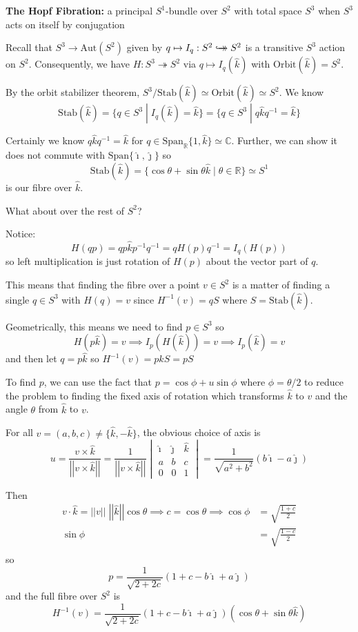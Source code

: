 \documentclass[12pt]{article}
\renewcommand{\hat}[1]{\widehat{#1}}
\newcommand{\R}{\mathbb{R}}
\newcommand{\C}{\mathbb{C}}
\newcommand{\norm}[1]{\left\vert \left\vert #1 \right\vert \right\vert}
\newcommand{\biject}{\hookrightarrow \hspace{-8pt} \rightarrow}
\newcommand{\Aut}{\text{Aut}}
\newcommand{\ihat}{\hat{\imath}}
\newcommand{\jhat}{\hat{\jmath}}
\newcommand{\khat}{\hat{k}}
\begin{document}
\textbf{The Hopf Fibration:} a principal $S^1$-bundle over $S^2$ with total space $S^3$ when $S^3$ acts on itself by conjugation

Recall that $S^3 \to \Aut(S^2)$ given by $q \mapsto I_q: S^2 \biject S^2$ is a transitive $S^3$ action on $S^2$. Consequently, we have $H: S^3 \twoheadrightarrow S^2$ via $q \mapsto I_q(\khat)$ with $\text{Orbit}(\khat) = S^2$. 

By the orbit stabilizer theorem, $S^3/\text{Stab}(\khat) \simeq \text{Orbit}(\khat) \simeq S^2$. We know 
\[\text{Stab}(\khat) = \{q \in S^3 \; | \; I_q(\khat) = \khat\} = \{q \in S^3 \; | \; q\khat q^{-1} = \khat\}\] 

Certainly we know $q\khat q^{-1} = \khat$ for $q \in \text{Span}_{\R}\{1, \khat\} \simeq \C$. Further, we can show it does not commute with $\text{Span}\{\ihat, \jhat\}$ so 
\[\text{Stab}(\khat) = \{\cos \theta + \sin \theta \khat \; | \; \theta \in \R\} \simeq S^1\]
is our fibre over $\khat$. 

What about over the rest of $S^2$? 

Notice: 
\[H(qp) = qp\khat p^{-1}q^{-1} = qH(p)q^{-1} = I_q(H(p))\]
so left multiplication is just rotation of $H(p)$ about the vector part of $q$. 

This means that finding the fibre over a point $v \in S^2$ is a matter of finding a single $q \in S^3$ with $H(q) = v$ since $H^{-1}(v) = qS$ where $S = \text{Stab}(\khat)$. 

Geometrically, this means we need to find $p \in S^3$ so 
\[H(p\khat) = v \implies I_p(H(\khat)) = v \implies I_p(\khat) = v\]
and then let $q = p\khat$ so $H^{-1}(v) = p\khat S = pS$ 

To find $p$, we can use the fact that $p = \cos \phi + u\sin \phi$ where $\phi = \theta/2$ to reduce the problem to finding the fixed axis of rotation which transforms $\khat$ to $v$ and the angle $\theta$ from $\khat$ to $v$.

For all $v = (a, b, c)\neq \{\khat, -\khat\}$, the obvious choice of axis is 
\[u = \frac{v \times \khat}{\norm{v \times \khat}} = \frac{1}{\norm{v \times \khat}} \begin{vmatrix}
    \ihat & \jhat & \khat\\
    a & b & c\\
    0 & 0 & 1
\end{vmatrix} = \frac{1}{\sqrt{a^2 + b^2}}(b\ihat - a\jhat)\]

Then 
\begin{align*}
    v \cdot \khat = \norm{v}\; \norm{\khat} \cos \theta \implies c = \cos \theta \implies \cos \phi &= \sqrt{\frac{1 + c}{2}}\\ 
    \sin \phi &= \sqrt{\frac{1 - c}{2}}\\
\end{align*}
so 
\[p = \frac{1}{\sqrt{2 + 2c}}(1 + c - b\ihat + a\jhat)\]
and the full fibre over $S^2$ is 
\[H^{-1}(v) = \frac{1}{\sqrt{2 + 2c}}(1 + c - b\ihat + a\jhat)(\cos \theta + \sin \theta \khat)\]
\end{document}
